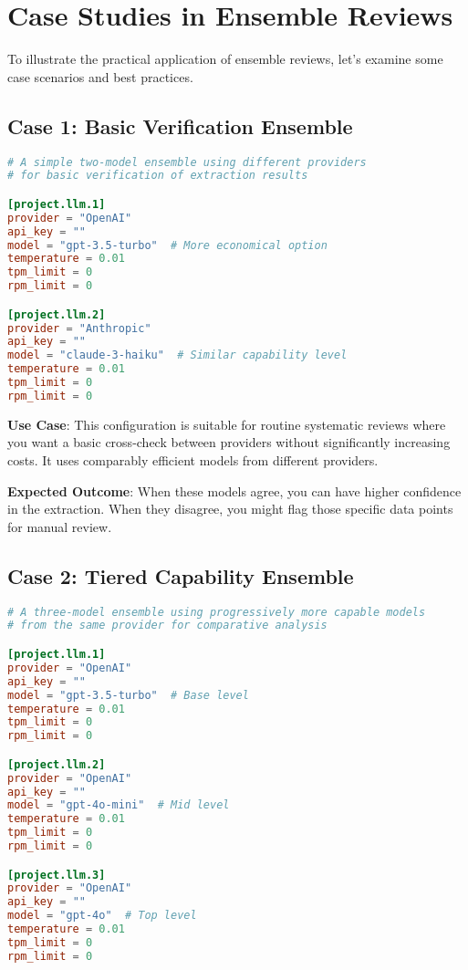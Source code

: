 \section{Case Studies in Ensemble Reviews}

To illustrate the practical application of ensemble reviews, let's examine some case scenarios and best practices.

\subsection{Case 1: Basic Verification Ensemble}

\begin{configbox}
\begin{lstlisting}[language=TOML]
# A simple two-model ensemble using different providers
# for basic verification of extraction results

[project.llm.1]
provider = "OpenAI"
api_key = ""
model = "gpt-3.5-turbo"  # More economical option
temperature = 0.01
tpm_limit = 0
rpm_limit = 0

[project.llm.2]
provider = "Anthropic"
api_key = ""
model = "claude-3-haiku"  # Similar capability level
temperature = 0.01
tpm_limit = 0
rpm_limit = 0
\end{lstlisting}
\end{configbox}

\textbf{Use Case}: This configuration is suitable for routine systematic reviews where you want a basic cross-check between providers without significantly increasing costs. It uses comparably efficient models from different providers.

\textbf{Expected Outcome}: When these models agree, you can have higher confidence in the extraction. When they disagree, you might flag those specific data points for manual review.

\subsection{Case 2: Tiered Capability Ensemble}

\begin{configbox}
\begin{lstlisting}[language=TOML]
# A three-model ensemble using progressively more capable models
# from the same provider for comparative analysis

[project.llm.1]
provider = "OpenAI"
api_key = ""
model = "gpt-3.5-turbo"  # Base level
temperature = 0.01
tpm_limit = 0
rpm_limit = 0

[project.llm.2]
provider = "OpenAI"
api_key = ""
model = "gpt-4o-mini"  # Mid level
temperature = 0.01
tpm_limit = 0
rpm_limit = 0

[project.llm.3]
provider = "OpenAI"
api_key = ""
model = "gpt-4o"  # Top level
temperature = 0.01
tpm_limit = 0
rpm_limit = 0
\end{lstlisting}
\end{configbox}

